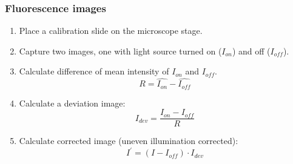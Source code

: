 \subsubsection{Fluorescence images}

\begin{enumerate}
\item Place a calibration slide on the microscope stage.
\item Capture two images, one with light source turned on ($I_{on}$) and off ($I_{off}$).
\item Calculate difference of mean intensity of $I_{on}$ and $I_{off}$.
\[
R = \widehat{I_{on}} - \widehat{I_{off}}
\]
\item Calculate a deviation image:
\[
I_{dev} = \frac{I_{on}-I_{off}}{R}
\]
\item Calculate corrected image (uneven illumination corrected):
\[
I^{'}=(I - I_{off}) \cdot I_{dev}
\]
\end{enumerate}

\clearpage
